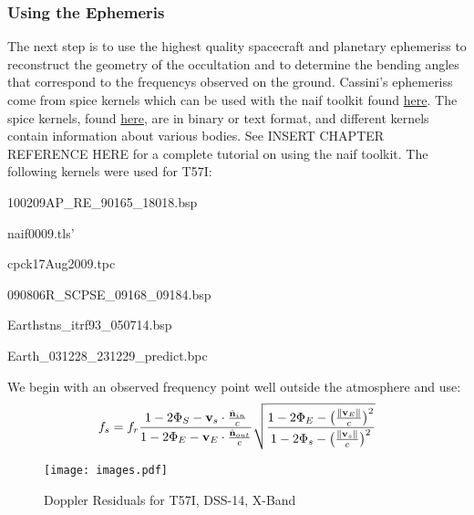 \documentclass{article}
\begin{document}
            \subsubsection{\footnotesize Using the Ephemeris}
            The next step is to use the highest quality spacecraft and planetary \glspl{ephemeris} to reconstruct the geometry of the \gls{occultation} and to determine the \glspl{bending angle} that correspond to the \glspl{frequency} observed on the ground. Cassini's \glspl{ephemeris} come from \gls{spice} \glspl{kernel} which can be used with the \gls{naif} toolkit found \href{ftp://naif.jpl.nasa.gov/pub/naif/toolkit}{here}. The \gls{spice} \glspl{kernel}, found \href{ftp://naif.jpl.nasa.gov/pub/naif/CASSINI/kernels}{here}, are in binary or text format, and different \glspl{kernel} contain information about various bodies. See INSERT CHAPTER REFERENCE HERE for a complete tutorial on using the \gls{naif} toolkit. The following \glspl{kernel} were used for T57I:
            \begin{itemize}
            \begin{multicols}{2}
                \item 100209AP\_RE\_90165\_18018.bsp
                \item naif0009.tls'
                \item cpck17Aug2009.tpc
                \item 090806R\_SCPSE\_09168\_09184.bsp
                \item Earthstns\_itrf93\_050714.bsp
                \item Earth\_031228\_231229\_predict.bpc
            \end{multicols}
            \end{itemize}
            We begin with an observed frequency point well outside the atmosphere and use:
            \begin{equation}
            f_{s} = f_{r}\frac{1-2\Phi_{S}-\mathbf{v}_{s}\cdot \frac{\hat{\mathbf{n}}_{in}}{c}}{1-2\Phi_{E}-\mathbf{v}_{E}\cdot \frac{\hat{\mathbf{n}}_{out}}{c}}\sqrt{\frac{1-2\Phi_{E} - \big(\frac{\lVert\mathbf{v}_{E}\rVert}{c}\big)^2}{1-2\Phi_{s}-\big(\frac{\lVert\mathbf{v}_{s}\rVert}{c}\big)^2}}
            \end{equation}
            \par
            \begin{wrapfigure}[11]{r}{0.4\textwidth}
            	\centering
                \vspace{-3ex}
            	\texttt{[image: images.pdf]}
            	\caption{Doppler Residuals for T57I, DSS-14, X-Band}
            	\label{fig:usr_doppler_resid_titan_t57I_dss14_x}
            \end{wrapfigure}
\end{document}
